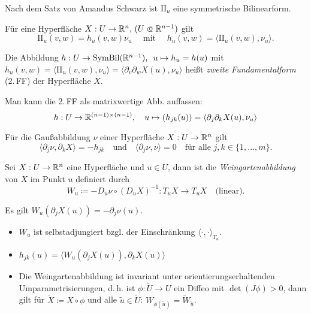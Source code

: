 \documentclass{cheat-sheet}
\newcommand{\SymBil}{\mathrm{SymBil}}
\newcommand{\II}{\mathrm{I\!I}}
\begin{document}
\begin{bem}
  Nach dem Satz von Amandus Schwarz ist $\II_u$ eine symmetrische Bilinearform.
\end{bem}

\begin{bem}
  Für eine Hyperfläche $X : U \to \R^n, \, (U \opn \R^{n-1})$ gilt
  \[ \II_u(v, w) = h_u(v, w) \nu_u \quad \text{ mit } \quad h_u(v, w) = \langle \II_u(v, w) , \nu_u \rangle. \]
\end{bem}

\begin{defn} Die Abbildung \enspace $h : U \to \SymBil(\R^{n-1}), \enspace u \mapsto h_u = h(u)$
  mit $h_u(v, w) = \langle \II_u(v, w), \nu_u \rangle = \langle \partial_v \partial_w X(u), \nu_u \rangle$ heißt \emph{zweite Fundamentalform} (2.\,FF) der Hyperfläche $X$.
\end{defn}

\begin{bem}
  Man kann die 2.\,FF als matrixwertige Abb. auffassen:
  \[ h : U \to \mathbb{R}^{(n-1) \times (n-1)}, \quad u \mapsto (h_{jk}(u)) = \langle \partial_j \partial_k X(u), \nu_u \rangle \]
\end{bem}

\begin{satz}
  Für die Gaußabbildung $\nu$ einer Hyperfläche $X : U \to \mathbb{R}^n$ gilt
  \[
    \langle \partial_j \nu , \partial_k X \rangle = - h_{jk}
    \quad \text{und} \quad
    \langle \partial_j \nu, \nu \rangle = 0
    \quad \text{für alle } j, k \in \{ 1, ..., m \}.
  \]
\end{satz}

\begin{defn}
  Sei $X : U \to \mathbb{R}^n$ eine Hyperfläche und $u \in U$, dann ist die
  \emph{Weingartenabbildung} von $X$ im Punkt $u$ definiert durch
  \[
    W_u \coloneqq - D_u \nu \circ (D_u X)^{-1} : T_u X \to T_u X
    \quad \text{(linear).}
  \]
\end{defn}

\begin{bem}
  Es gilt $W_u(\partial_j X(u)) = - \partial_j \nu(u)$.
\end{bem}

\begin{satz}
  \begin{itemize}
    \item $W_u$ ist selbstadjungiert bzgl. der Einschränkung $\langle \cdot , \cdot \rangle_{T_u}$.
    \item $h_{jk}(u) = \langle W_u(\partial_j X(u)), \partial_k X(u) \rangle$
    \item Die Weingartenabbildung ist invariant unter orientierungserhaltenden Umparametrisierungen, d.\,h. ist $\phi : \tilde{U} \to U$ ein Diffeo mit $\det(J\phi) > 0$, dann gilt für $\tilde{X} \coloneqq X \circ \phi$ und alle $\tilde{u} \in \tilde{U}$: $W_{\phi(\tilde{u})} = \tilde{W}_{\tilde{u}}$.
  \end{itemize}
\end{satz}
\end{document}
